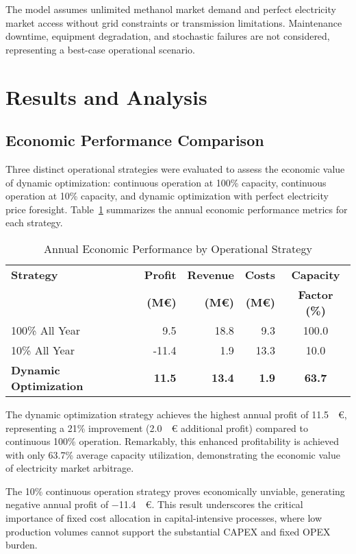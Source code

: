 \documentclass[12pt,a4paper]{article}
\begin{document}
The model assumes unlimited methanol market demand and perfect electricity market access without grid constraints or transmission limitations. Maintenance downtime, equipment degradation, and stochastic failures are not considered, representing a best-case operational scenario.

\section{Results and Analysis}

\subsection{Economic Performance Comparison}

Three distinct operational strategies were evaluated to assess the economic value of dynamic optimization: continuous operation at 100\% capacity, continuous operation at 10\% capacity, and dynamic optimization with perfect electricity price foresight. Table~\ref{tab:economic_performance} summarizes the annual economic performance metrics for each strategy.

\begin{table}[H]
\centering
\caption{Annual Economic Performance by Operational Strategy}
\label{tab:economic_performance}
\begin{tabular}{@{}lrrrc@{}}
\toprule
\textbf{Strategy} & \textbf{Profit} & \textbf{Revenue} & \textbf{Costs} & \textbf{Capacity} \\
& \textbf{(M€)} & \textbf{(M€)} & \textbf{(M€)} & \textbf{Factor (\%)} \\
\midrule
100\% All Year & 9.5 & 18.8 & 9.3 & 100.0 \\
10\% All Year & -11.4 & 1.9 & 13.3 & 10.0 \\
\textbf{Dynamic Optimization} & \textbf{11.5} & \textbf{13.4} & \textbf{1.9} & \textbf{63.7} \\
\bottomrule
\end{tabular}
\end{table}

The dynamic optimization strategy achieves the highest annual profit of \SI{11.5}{\mega\euro}, representing a 21\% improvement (\SI{2.0}{\mega\euro} additional profit) compared to continuous 100\% operation. Remarkably, this enhanced profitability is achieved with only 63.7\% average capacity utilization, demonstrating the economic value of electricity market arbitrage.

The 10\% continuous operation strategy proves economically unviable, generating negative annual profit of \SI{-11.4}{\mega\euro}. This result underscores the critical importance of fixed cost allocation in capital-intensive processes, where low production volumes cannot support the substantial CAPEX and fixed OPEX burden.
\end{document}
